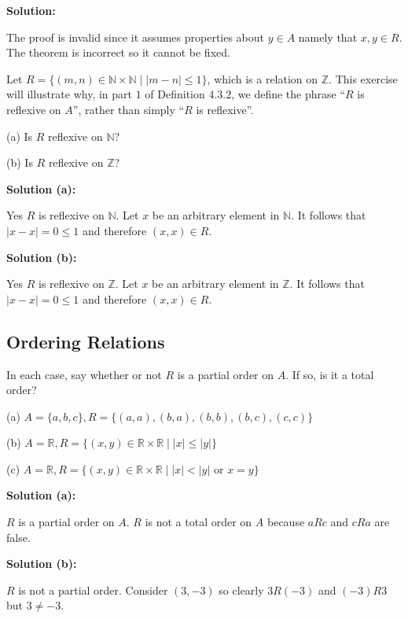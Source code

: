 \textbf{Solution:}

The proof is invalid since it assumes properties about $y \in A$ namely that $x, y \in R$.
The theorem is incorrect so it cannot be fixed.

\begin{tcolorbox}[title=Problem 24, breakable]
    Let $R = \{(m, n) \in \mathbb{N} \times \mathbb{N} \mid |m - n| \le 1\}$,
    which is a relation on $\mathbb{Z}$. This exercise will illustrate
    why, in part $1$ of Definition $4.3.2$, we define the phrase ``$R$ is 
    reflexive on $A$'', rather than simply ``$R$ is reflexive''.
    
    (a) Is $R$ reflexive on $\mathbb{N}$?

    (b) Is $R$ reflexive on $\mathbb{Z}$?
\end{tcolorbox}

\textbf{Solution (a):}

Yes $R$ is reflexive on $\mathbb{N}$. Let $x$ be an arbitrary element in $\mathbb{N}$.
    It follows that $|x - x| = 0 \le 1$ and therefore $(x, x) \in R$.
    
\textbf{Solution (b):} 

Yes $R$ is reflexive on $\mathbb{Z}$. Let $x$ be an arbitrary element in $\mathbb{Z}$.
    It follows that $|x - x| = 0 \le 1$ and therefore $(x, x) \in R$.

\subsection{Ordering Relations}

\begin{tcolorbox}[title=Problem 1, breakable]
    In each case, say whether or not $R$ is a partial order on $A$.
    If so, is it a total order? 

    (a) $A = \{a, b, c\}, R = \{(a, a), (b, a), (b, b), (b, c), (c, c)\}$ 

    (b) $A = \mathbb{R}, R = \{(x, y) \in \mathbb{R} \times \mathbb{R} \mid |x| \le |y|\}$ 

    (c) $A = \mathbb{R}, R = \{(x, y) \in \mathbb{R} \times \mathbb{R} \mid |x| < |y| \text{ or } x = y\}$
\end{tcolorbox}

\textbf{Solution (a):}

$R$ is a partial order on $A$.
$R$ is not a total order on $A$ because $aRc$ and $cRa$ are false.

\textbf{Solution (b):}

$R$ is not a partial order.
Consider $(3, -3)$ so clearly $3R(-3)$ and $(-3)R3$ but $3 \not= -3$.

